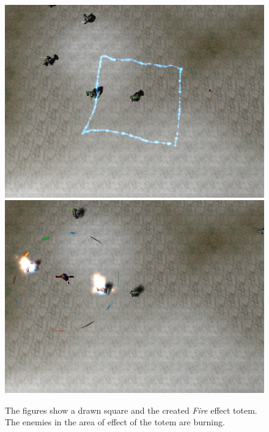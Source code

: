 \begin{figure}[p]
\centering
\includegraphics[width=.9\linewidth]{ext/scr/square.png}
\quad
\includegraphics[width=.9\linewidth]{ext/scr/squaree.png}
\caption{The figures show a drawn square and the created \emph{Fire} effect totem. The enemies in the area of effect of the totem are burning. }
\label{fig:spell:square}
\end{figure}


